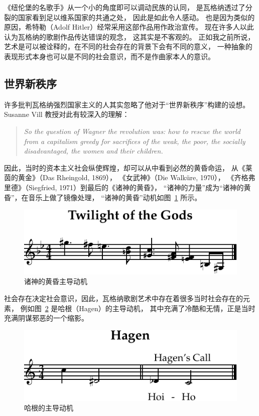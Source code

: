 \documentclass[10pt,a4paper,twocolumn]{article}
\begin{document}
      《纽伦堡的名歌手》从一个小的角度即可以调动民族的认同，
      是瓦格纳透过了分裂的国家看到足以维系国家的共通之处，
      因此是如此令人感动。
      也是因为类似的原因，希特勒（Adolf Hitler）经常采用这部作品用作政治宣传。
      现在许多人以此认为瓦格纳的歌剧作品传达错误的观念，
      这其实是不客观的。
      正如我之前所说，艺术是可以被诠释的，在不同的社会存在的背景下会有不同的意义，
      一种抽象的表现形式本身也可以是不同的社会意识，而不是作曲家本人的意识。

    \subsection{世界新秩序}

      许多批判瓦格纳强烈国家主义的人其实忽略了他对于``世界新秩序''构建的设想。
      Susanne Vill 教授对此有较深入的理解\cite{vill2013woman}：
      \begin{quote}\itshape
        So the question of Wagner the revolution was:
        how to rescue the world from a capitalism greedy
        for sacrifices of the weak, the poor, the socially disadvantaged,
        the women and their children.
      \end{quote}
      因此，当时的资本主义社会纵使辉煌，却可以从中看到必然的黄昏命运，
      从《莱茵的黄金》（Das Rheingold, 1869），
      《女武神》（Die Walküre, 1970），
      《齐格弗里德》（Siegfried, 1971）到最后的《诸神的黄昏》，
      ``诸神的力量''成为``诸神的黄昏''，在音乐上做了镜像处理，
      ``诸神的黄昏''动机如图~\ref{fig:twilight} 所示。
      \begin{figure}[htbp]
        \centering
        \includegraphics{music/twilight-crop.pdf}
        \caption{诸神的黄昏主导动机\cite{wagner1876gotterdammerung}}
        \label{fig:twilight}
      \end{figure}
      
      社会存在决定社会意识，因此，瓦格纳歌剧艺术中存在着很多当时社会存在的元素，
      例如图~\ref{fig:hagen} 是哈根（Hagen）的主导动机，
      其中充满了冷酷和无情，正是当时充满阴谋邪恶的一个缩影。
      \begin{figure}[htbp]
        \centering
        \includegraphics{music/hagen-crop.pdf}
        \caption{哈根的主导动机\cite{wagner1876gotterdammerung}}
        \label{fig:hagen}
      \end{figure}
\end{document}
